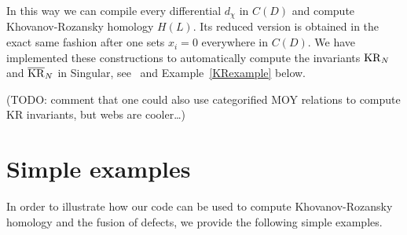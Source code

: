 \documentclass{compositio}
\theoremstyle{definition}
\numberwithin{equation}{section}
\begin{document}
In this way we can compile every differential $d_{\chi}$ in $C(D)$ and compute Khovanov-Rozansky homology $H(L)$. Its reduced version is obtained in the exact same fashion after one sets $x_{i}=0$ everywhere in $C(D)$. We have implemented these constructions to automatically compute the invariants $\operatorname{KR}_{N}$ and $\overline{\operatorname{KR}}_{N}$ in Singular, see~\cite{cmWebCompileCode} and Example~\ref{KRexample} below.

(TODO: comment that one could also use categorified MOY relations to compute KR invariants, but webs are cooler\dots)


\section{Simple examples}
\label{simpleexamples}

In order to illustrate how our code can be used to compute Khovanov-Rozansky homology and the fusion of defects, we provide the following simple examples. 
\end{document}
